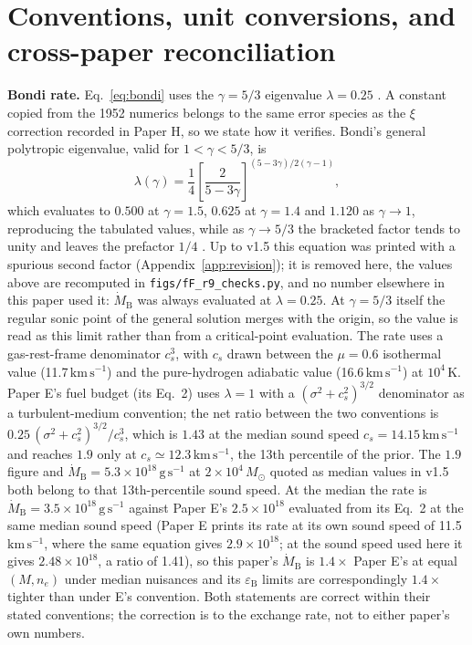 \documentclass[11pt]{article}
\newcommand{\msun}{\ensuremath{M_\odot}}
\newcommand{\mdotB}{\ensuremath{\dot{M}_{\mathrm{B}}}}
\newcommand{\eps}{\ensuremath{\varepsilon_{\mathrm{B}}}}
\begin{document}
\appendix

\section{Conventions, unit conversions, and cross-paper reconciliation}
\label{app:conventions}

\textbf{Bondi rate.} Eq.~\ref{eq:bondi} uses the $\gamma = 5/3$ eigenvalue $\lambda = 0.25$ \citep{Bondi1952}. A constant copied from the 1952 numerics belongs to the same error species as the $\xi$ correction recorded in Paper H, so we state how it verifies. Bondi's general polytropic eigenvalue, valid for $1 < \gamma < 5/3$, is
\begin{equation}
\lambda(\gamma) = \frac{1}{4}\left[\frac{2}{5-3\gamma}\right]^{(5-3\gamma)/2(\gamma-1)},
\label{eq:lambdagamma}
\end{equation}
which evaluates to $0.500$ at $\gamma = 1.5$, $0.625$ at $\gamma = 1.4$ and $1.120$ as $\gamma \to 1$, reproducing the tabulated values, while as $\gamma \to 5/3$ the bracketed factor tends to unity and leaves the prefactor $1/4$ \citep[see also][]{FrankKingRaine2002}. Up to v1.5 this equation was printed with a spurious second factor (Appendix~\ref{app:revision}); it is removed here, the values above are recomputed in \texttt{figs/fF\_r9\_checks.py}, and no number elsewhere in this paper used it: \mdotB{} was always evaluated at $\lambda = 0.25$. At $\gamma = 5/3$ itself the regular sonic point of the general solution merges with the origin, so the value is read as this limit rather than from a critical-point evaluation. The rate uses a gas-rest-frame denominator $c_{s}^{3}$, with $c_{s}$ drawn between the $\mu = 0.6$ isothermal value (11.7\,$\mathrm{km\,s^{-1}}$) and the pure-hydrogen adiabatic value (16.6\,$\mathrm{km\,s^{-1}}$) at $10^{4}$\,K. Paper E's fuel budget (its Eq.~2) uses $\lambda = 1$ with a $(\sigma^{2}+c_{s}^{2})^{3/2}$ denominator as a turbulent-medium convention; the net ratio between the two conventions is $0.25\,(\sigma^{2}+c_{s}^{2})^{3/2}/c_{s}^{3}$, which is $1.43$ at the median sound speed $c_{s} = 14.15\,\mathrm{km\,s^{-1}}$ and reaches $1.9$ only at $c_{s} \simeq 12.3\,\mathrm{km\,s^{-1}}$, the 13th percentile of the prior. The $1.9$ figure and $\mdotB = 5.3\times10^{18}\,\mathrm{g\,s^{-1}}$ at $2\times10^{4}\,\msun$ quoted as median values in v1.5 both belong to that 13th-percentile sound speed. At the median the rate is $\mdotB = 3.5\times10^{18}\,\mathrm{g\,s^{-1}}$ against Paper E's $2.5\times10^{18}$ evaluated from its Eq.~2 at the same median sound speed (Paper E prints its rate at its own sound speed of 11.5\,$\mathrm{km\,s^{-1}}$, where the same equation gives $2.9\times10^{18}$; at the sound speed used here it gives $2.48\times10^{18}$, a ratio of 1.41), so this paper's \mdotB{} is $1.4\times$ Paper E's at equal $(M, n_{e})$ under median nuisances and its $\eps$ limits are correspondingly $1.4\times$ tighter than under E's convention. Both statements are correct within their stated conventions; the correction is to the exchange rate, not to either paper's own numbers.
\end{document}
